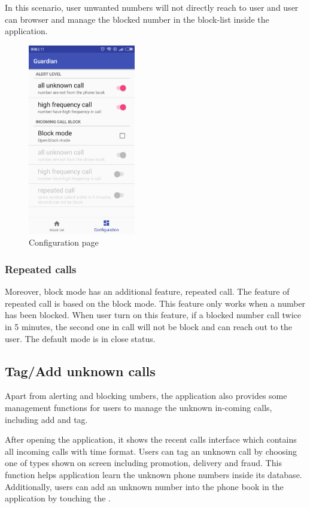 \documentclass{article}
\begin{document}
In this scenario, user unwanted numbers will not directly reach to user and user can browser and manage the blocked number in the block-list inside the application.

\begin{figure}[H]
    \centering 
    \includegraphics[width=0.418\textwidth]{images/config.jpg}
    \caption{Configuration page}
    \label{image_config}
\end{figure}

\subsubsection{Repeated calls}
Moreover, block mode has an additional feature, repeated call. The feature of repeated call is based on the block mode. This feature only works when a number has been blocked. When user turn on this feature, if a blocked number call twice in 5 minutes, the second one in call will not be block and can reach out to the user. The default mode is in close status.

\subsection{Tag/Add unknown calls}
Apart from alerting and blocking umbers, the application also provides some management functions for users to manage the unknown in-coming calls, including add and tag.

After opening the application, it shows the recent calls interface which contains all incoming calls with time format. Users can tag an unknown call by choosing one of types shown on screen including promotion, delivery and fraud. This function helps application learn the unknown phone numbers inside its database. Additionally, users can add an unknown number into the phone book in the application by touching the . 
\end{document}
